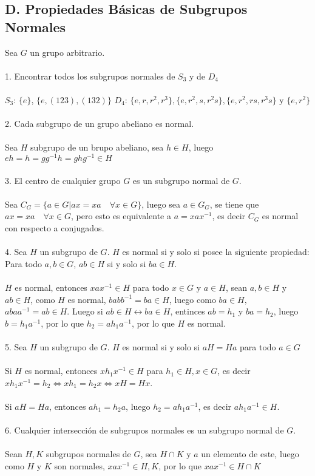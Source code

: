 \documentclass{article}
\begin{document}
\subsection*{D. Propiedades Básicas de Subgrupos Normales}
Sea $G$ un grupo arbitrario.
\\
\\
1. Encontrar todos los subgrupos normales de $S_3$ y de $D_4$
\\
\\
$S_3$: $\{e\}$, $\{e,(123),(132)\}$
$D_4$: $\{e,r,r^{2},r^{3}\},\{e,r^{2},s,r^{2}s\}, \{e,r^{2},rs,r^{3}s\}$ y $\{e,r^{2}\}$
\\
\\
2. Cada subgrupo de un grupo abeliano es normal.
\\
\\
Sea $H$ subgrupo de un brupo abeliano, sea $h \in H$, luego $eh=h=gg^{-1}h=ghg^{-1} \in H$
\\
\\
3. El centro de cualquier grupo $G$ es un subgrupo normal de $G$.
\\
\\
Sea $C_{G}=\{a \in G | ax=xa \quad \forall x\in G \}$, luego sea $a \in G_{G}$, se tiene que $ax=xa \quad \forall x \in G$, pero esto es equivalente a $a=xax^{-1}$, es decir $C_{G}$ es normal con respecto a conjugados.
\\
\\
4. Sea $H$ un subgrupo de $G$. $H$ es normal si y solo si posee la siguiente propiedad: Para todo $a,b \in G$, $ab \in H$ si y solo si $ba \in H$.
\\
\\
$H$ es normal, entonces $xax^{-1} \in H$ para todo $x \in G$ y $a \in H$, sean $a,b \in H$ y $ab \in H$, como $H$ es normal, $babb^{-1}=ba \in H$, luego como $ba \in H,$ $abaa^{-1}=ab \in H$. Luego si $ab \in H \longleftrightarrow ba \in H$, entinces $ab=h_1$ y $ba=h_{2}$, luego $b=h_{1}a^{-1}$, por lo que $h_2=ah_1a^{-1}$, por lo que $H$ es normal.
\\
\\
5. Sea $H$ un subgrupo de $G$. $H$ es normal si y solo si $aH=Ha$ para todo $a \in G$
\\
\\
Si $H$ es normal, entonces $xh_1x^{-1}\in H$ para $h_1 \in H, x \in G$, es decir $xh_1x^{-1}=h_2 \Longleftrightarrow xh_1=h_2x \Longleftrightarrow xH=Hx$.
\\
\\
Si $aH=Ha$, entonces $ah_1=h_2a$, luego $h_2=ah_1a^{-1}$, es decir $ah_1a^{-1} \in H$.
\\
\\
6. Cualquier intersección de subgrupos normales es un subgrupo normal de $G$.
\\
\\
Sean $H,K$ subgrupos normales de $G$, sea $H \cap K$ y $a$ un elemento de este, luego como $H$ y $K$ son normales, $xax^{-1}\in H,K$, por lo que $xax^{-1} \in H \cap K$
\end{document}
